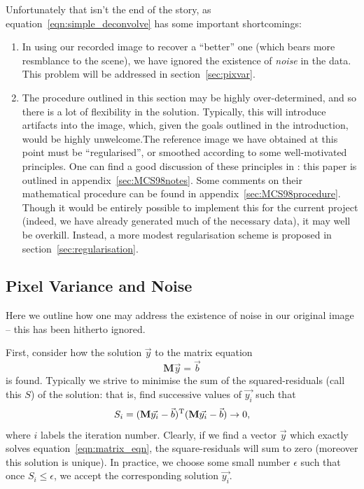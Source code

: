 \documentclass[letterpaper, 11pt]{article}
\def\ra{\ensuremath{\rightarrow}\xspace}
\begin{document}
Unfortunately that isn't the end of the story, as equation~\ref{eqn:simple_deconvolve} has some important shortcomings:

\begin{enumerate}
	\item In using our recorded image to recover a ``better'' one (which bears more resmblance to the scene), we have ignored the existence of \emph{noise} in the data. This problem will be addressed in section~\vref{sec:pixvar}.
	
	\item The procedure outlined in this section may be highly over-determined, and so there is a lot of flexibility in the solution. Typically, this will introduce artifacts into the image, which, given the goals outlined in the introduction, would be highly unwelcome.\newline The reference image we have obtained at this point must be ``regularised'', or smoothed according to some well-motivated principles. One can find a good discussion of these principles in \citet{MCS98}: this paper is outlined in appendix~\ref{sec:MCS98notes}. Some comments on their mathematical procedure can be found in appendix~\ref{sec:MCS98procedure}. \newline Though it would be entirely possible to implement this for the current project (indeed, we have already generated much of the necessary data), it may well be overkill. Instead, a more modest regularisation scheme is proposed in section~\ref{sec:regularisation}.
\end{enumerate}

\subsection{Pixel Variance and Noise}
\label{sec:pixvar}

Here we outline how one may address the existence of noise in our original image -- this has been hitherto ignored.

First, consider how the solution $\vec y$ to the matrix equation
\begin{equation}
	\mathbf M \vec y = \vec b \label{eqn:matrix_eqn}
\end{equation}
is found. Typically we strive to minimise the sum of the squared-residuals (call this $S$) of the solution: that is, find successive values of $\vec {y_i}$ such that
\begin{equation} \label{eqn:sum_residuals}
	S_i = (\mathbf M \vec{y_i} - \vec b)^{\rm T}(\mathbf M \vec{y_i} - \vec b) \ra 0,
\end{equation}
where $i$ labels the iteration number. Clearly, if we find a vector $\vec y$ which exactly solves equation~\ref{eqn:matrix_eqn}, the square-residuals will sum to zero (moreover this solution is unique). In practice, we choose some small number $\epsilon$ such that once $S_i \leq \epsilon$, we accept the corresponding solution $\vec {y_i}$.
\end{document}
